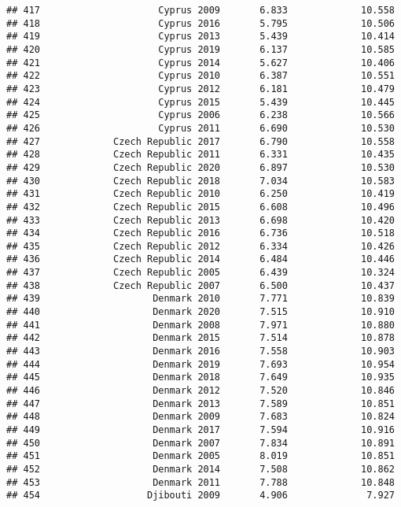\documentclass[
]{article}
\begin{document}
\begin{verbatim}
## 417                     Cyprus 2009       6.833             10.558
## 418                     Cyprus 2016       5.795             10.506
## 419                     Cyprus 2013       5.439             10.414
## 420                     Cyprus 2019       6.137             10.585
## 421                     Cyprus 2014       5.627             10.406
## 422                     Cyprus 2010       6.387             10.551
## 423                     Cyprus 2012       6.181             10.479
## 424                     Cyprus 2015       5.439             10.445
## 425                     Cyprus 2006       6.238             10.566
## 426                     Cyprus 2011       6.690             10.530
## 427             Czech Republic 2017       6.790             10.558
## 428             Czech Republic 2011       6.331             10.435
## 429             Czech Republic 2020       6.897             10.530
## 430             Czech Republic 2018       7.034             10.583
## 431             Czech Republic 2010       6.250             10.419
## 432             Czech Republic 2015       6.608             10.496
## 433             Czech Republic 2013       6.698             10.420
## 434             Czech Republic 2016       6.736             10.518
## 435             Czech Republic 2012       6.334             10.426
## 436             Czech Republic 2014       6.484             10.446
## 437             Czech Republic 2005       6.439             10.324
## 438             Czech Republic 2007       6.500             10.437
## 439                    Denmark 2010       7.771             10.839
## 440                    Denmark 2020       7.515             10.910
## 441                    Denmark 2008       7.971             10.880
## 442                    Denmark 2015       7.514             10.878
## 443                    Denmark 2016       7.558             10.903
## 444                    Denmark 2019       7.693             10.954
## 445                    Denmark 2018       7.649             10.935
## 446                    Denmark 2012       7.520             10.846
## 447                    Denmark 2013       7.589             10.851
## 448                    Denmark 2009       7.683             10.824
## 449                    Denmark 2017       7.594             10.916
## 450                    Denmark 2007       7.834             10.891
## 451                    Denmark 2005       8.019             10.851
## 452                    Denmark 2014       7.508             10.862
## 453                    Denmark 2011       7.788             10.848
## 454                   Djibouti 2009       4.906              7.927

\end{verbatim}
\end{document}
